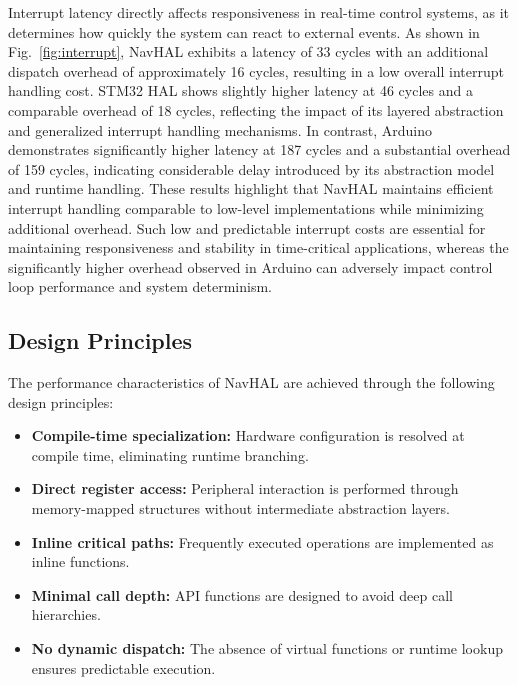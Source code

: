 Interrupt latency directly affects responsiveness in real-time control systems, as it determines how quickly the system can react to external events. As shown in Fig.~\ref{fig:interrupt}, NavHAL exhibits a latency of 33 cycles with an additional dispatch overhead of approximately 16 cycles, resulting in a low overall interrupt handling cost. STM32 HAL shows slightly higher latency at 46 cycles and a comparable overhead of 18 cycles, reflecting the impact of its layered abstraction and generalized interrupt handling mechanisms. In contrast, Arduino demonstrates significantly higher latency at 187 cycles and a substantial overhead of 159 cycles, indicating considerable delay introduced by its abstraction model and runtime handling. These results highlight that NavHAL maintains efficient interrupt handling comparable to low-level implementations while minimizing additional overhead. Such low and predictable interrupt costs are essential for maintaining responsiveness and stability in time-critical applications, whereas the significantly higher overhead observed in Arduino can adversely impact control loop performance and system determinism.

\subsection{Design Principles}

The performance characteristics of NavHAL are achieved through the following design principles:

\begin{itemize}
    \item \textbf{Compile-time specialization:} Hardware configuration is resolved at compile time, eliminating runtime branching.
    \item \textbf{Direct register access:} Peripheral interaction is performed through memory-mapped structures without intermediate abstraction layers.
    \item \textbf{Inline critical paths:} Frequently executed operations are implemented as inline functions.
    \item \textbf{Minimal call depth:} API functions are designed to avoid deep call hierarchies.
    \item \textbf{No dynamic dispatch:} The absence of virtual functions or runtime lookup ensures predictable execution.
\end{itemize}